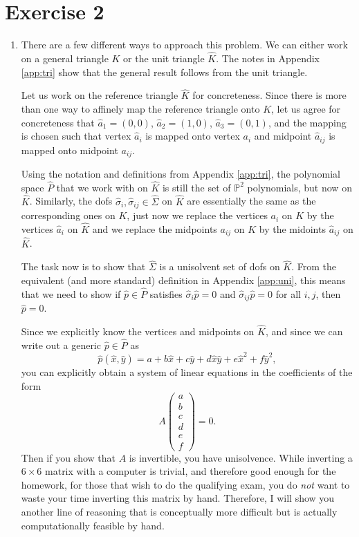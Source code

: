 \documentclass{article}
\theoremstyle{plain}
\theoremstyle{definition}
\theoremstyle{remark}
\begin{document}
\section*{Exercise 2}
\begin{enumerate}
	\item There are a few different ways to approach this problem.
	      We can either work on a general triangle $K$ or the unit triangle $\widehat K$.
	      The notes in Appendix \ref{app:tri} show that the general result follows from the unit triangle.

	      Let us work on the reference triangle $\widehat K$ for concreteness.
	      Since there is more than one way to affinely map the reference triangle onto $K$, let us agree for concreteness that $\widehat a_1 = (0,0)$, $\widehat a_2 = (1,0)$, $\widehat a_3 = (0,1)$, and the mapping is chosen such that vertex $\widehat a_i$ is mapped onto vertex $a_i$ and midpoint $\widehat a_{ij}$ is mapped onto midpoint $a_{ij}$.

	      Using the notation and definitions from Appendix \ref{app:tri}, the polynomial space $\widehat P$ that we work with on $\widehat K$ is still the set of $\mathbb P^2$ polynomials, but now on $\widehat K$.
	      Similarly, the dofs $\widehat \sigma_i, \widehat \sigma_{ij} \in \widehat \Sigma$ on $\widehat K$ are essentially the same as the corresponding ones on $K$, just now we replace the vertices $a_i$ on $K$ by the vertices $\widehat a_i$ on $\widehat K$ and we replace the midpoints $a_{ij}$ on $K$ by the midoints $\widehat a_{ij}$ on $\widehat K$.

	      The task now is to show that $\widehat \Sigma$ is a unisolvent set of dofs on $\widehat K$.
	      From the equivalent (and more standard) definition in Appendix \ref{app:uni}, this means that we need to show if $\widehat p \in \widehat P$ satisfies $\widehat \sigma_i \widehat p = 0$ and $\widehat \sigma_{ij} \widehat p = 0$ for all $i,j$, then $\widehat p = 0$.

	      Since we explicitly know the vertices and midpoints on $\widehat K$, and since we can write out a generic $\widehat p \in \widehat P$ as \[\widehat p(\widehat x, \widehat y) = a + b\widehat x + c\widehat y + d\widehat x\widehat y + e\widehat x^2 + f\widehat y^2,\]
	      you can explicitly obtain a system of linear equations in the coefficients of the form \[A\begin{pmatrix} a \\ b \\ c \\ d \\ e \\ f \end{pmatrix} = 0.\]
	      Then if you show that $A$ is invertible, you have unisolvence.
	      While inverting a $6 \times 6$ matrix with a computer is trivial, and therefore good enough for the homework, for those that wish to do the qualifying exam, you do \emph{not} want to waste your time inverting this matrix by hand.
	      Therefore, I will show you another line of reasoning that is conceptually more difficult but is actually computationally feasible by hand.


\end{enumerate}
\end{document}

